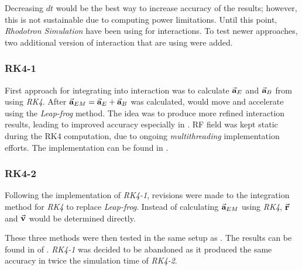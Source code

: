 \documentclass{book}
\begin{document}
Decreasing $dt$ would be the best way to increase accuracy of the results; however, this is not sustainable due to computing power limitations. 
Until this point, \textit{Rhodotron Simulation} have been using  for \eEM interactions. 
To test newer approaches, two additional version of  \eEM interaction that are using  were added.
\subsubsection{RK4-1}
First approach for integrating  into \eEM interaction was to calculate $\vec{\textbf{a}}_{E}$ and $\vec{\textbf{a}}_{B}$ from  using \textit{RK4}.
After $\vec{\textbf{a}}_{EM} = \vec{\textbf{a}}_{E} + \vec{\textbf{a}}_{B}$ was calculated, \e would move and accelerate using the \textit{Leap-frog} method. 
The idea was to produce more refined interaction results, leading to improved accuracy especially in \eB.
RF field was kept static during the RK4 computation, due to ongoing \textit{multithreading} implementation efforts. 
The implementation can be found in .
\subsubsection{RK4-2}
Following the implementation of \textit{RK4-1}, revisions were made to the integration method for \textit{RK4} to replace \textit{Leap-frog}.
Instead of calculating $\vec{\textbf{a}}_{EM}$ using \textit{RK4}, $\vec{\textbf{r}}$ and $\vec{\textbf{v}}$ would be determined directly.

These three methods were then tested in the same setup as . The results can be found in  of .
\textit{RK4-1} was decided to be abandoned as it produced the same accuracy in twice the simulation time of \textit{RK4-2}.
\end{document}
